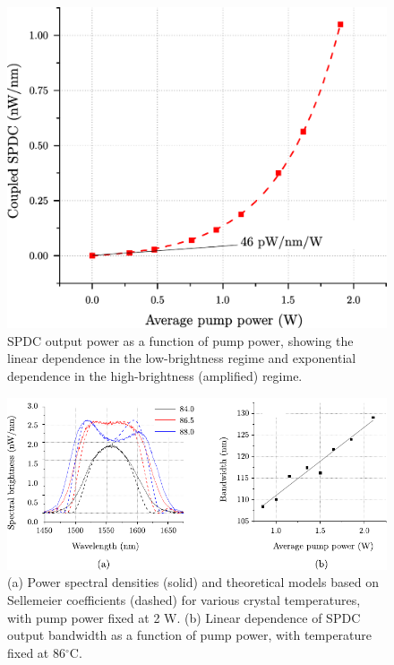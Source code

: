 \begin{figure}[t]
\begin{center}
\includegraphics[width=12cm]{figure-pcoct-data-power.pdf}
\caption{SPDC output power as a function of pump power, showing the linear dependence in the low-brightness regime and exponential dependence in the high-brightness (amplified) regime.}
\label{figure:pcoct-data-power}
\end{center}
\end{figure}

\begin{figure}[t]
\begin{center}
\includegraphics[width=\textwidth]{figure-pcoct-data-spectrum.pdf}
\caption{(a) Power spectral densities (solid) and theoretical models based on Sellemeier coefficients (dashed) for various crystal temperatures, with pump power fixed at 2 W. (b) Linear dependence of SPDC output bandwidth as a function of pump power, with temperature fixed at 86$^\circ$C.}
\label{figure:pcoct-data-spectrum}
\end{center}
\end{figure}



